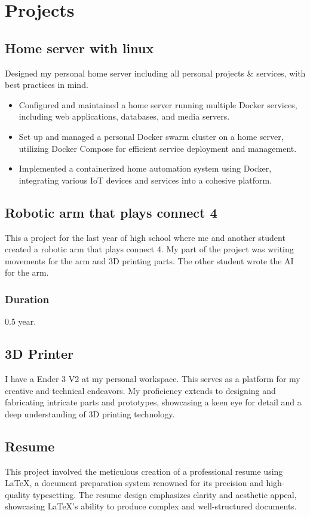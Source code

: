 \section{Proje\textcolor{mycolor}{cts}}
  \subsection{Home server with linux}

  Designed my personal home server including all personal projects \& services, with best practices in mind.
    
  \begin{itemize}
    \item Configured and maintained a home server running multiple Docker services, including web applications, databases, and media servers.
    \item Set up and managed a personal Docker swarm cluster on a home server, utilizing Docker Compose for efficient service deployment and management.
    \item Implemented a containerized home automation system using Docker, integrating various IoT devices and services into a cohesive platform.
  \end{itemize}

  \subsection{Robotic arm that plays connect 4}
    This a project for the last year of high school where me and another student created a robotic arm that plays connect 4.
    My part of the project was writing movements for the arm and 3D printing parts.
    The other student wrote the AI for the arm.
    \subsubsection{Duration}
      0.5 year.


  \subsection{3D Printer}
    I have a Ender 3 V2 at my personal workspace. This serves as a platform for my creative and technical endeavors. My proficiency extends to designing and fabricating intricate parts and prototypes, showcasing a keen eye for detail and a deep understanding of 3D printing technology.
    \vspace{.55em}
    \par
    \subsection{Resume}
    This project involved the meticulous creation of a professional resume using LaTeX, 
    a document preparation system renowned for its precision and high-quality typesetting. 
    The resume design emphasizes clarity and aesthetic appeal, 
    showcasing LaTeX's ability to produce complex and well-structured documents. 
   